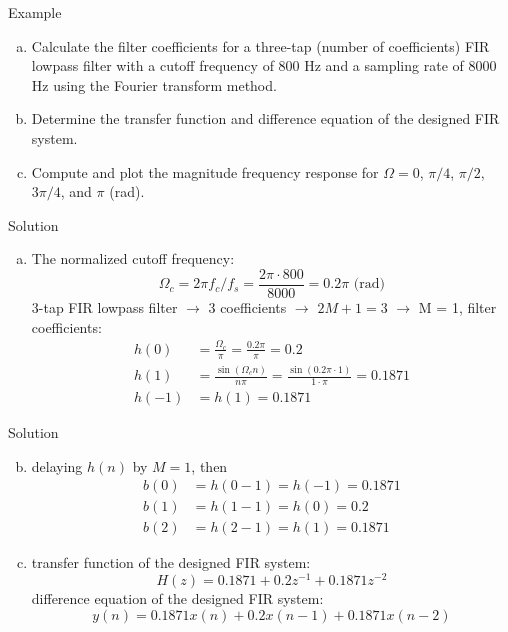 \documentclass[pdflatex,compress,mathserif]{beamer}
\begin{document}
\begin{frame}{Example}
    \begin{enumerate}[a.]
        \item Calculate the filter coefficients for a three-tap (number of coefficients) FIR lowpass filter with a cutoff frequency of 800 Hz and a sampling rate of 8000 Hz using the Fourier transform method.
        \item Determine the transfer function and difference equation of the designed FIR system.
        \item Compute and plot the magnitude frequency response for $\Omega = 0$, $\pi/4$, $\pi/2$, $3\pi/4$, and $\pi$ (rad).
    \end{enumerate}
\end{frame}

\begin{frame}{Solution}
    \begin{enumerate}[a.]
        \item The normalized cutoff frequency:$$ \Omega_c = 2 \pi f_c/f_s = \frac{2 \pi \cdot 800 }{8000} = 0.2 \pi \text{ (rad)}$$
        3-tap FIR lowpass filter $\rightarrow$ 3 coefficients $\rightarrow$ $2M + 1 = 3$ $\rightarrow$ M = 1, filter coefficients:
        \begin{align*}
            h(0) &= \frac{\Omega_c}{\pi} = \frac{0.2 \pi}{\pi} = 0.2 \\
            h(1) &= \frac{\sin(\Omega_c n)}{n \pi} = \frac{\sin(0.2 \pi \cdot 1)}{1 \cdot \pi}  = 0.1871 \\
            h(-1) &= h(1) = 0.1871
        \end{align*}
    \end{enumerate}
\end{frame}

\begin{frame}{Solution}
    \begin{enumerate}[a.]
        \setcounter{enumi}{1}
        \item[] delaying $h(n)$ by $M=1$, then
        \begin{align*}
            b(0) &= h(0-1) = h(-1) = 0.1871 \\
            b(1) &= h(1-1) = h(0) = 0.2 \\
            b(2) &= h(2-1) = h(1) = 0.1871
        \end{align*}
        \item transfer function of the designed FIR system: $$ H(z) = 0.1871 + 0.2z^{-1} + 0.1871z^{-2} $$  difference equation of the designed FIR system: $$ y(n) = 0.1871x(n) + 0.2x(n-1) + 0.1871x(n-2) $$
    \end{enumerate}
\end{frame}
\end{document}
